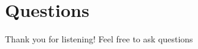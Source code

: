 \section{Questions}

\begin{frame}
    \centering

    \huge Thank you for listening!
    \vskip 1cm
    \large Feel free to ask questions

\end{frame}
